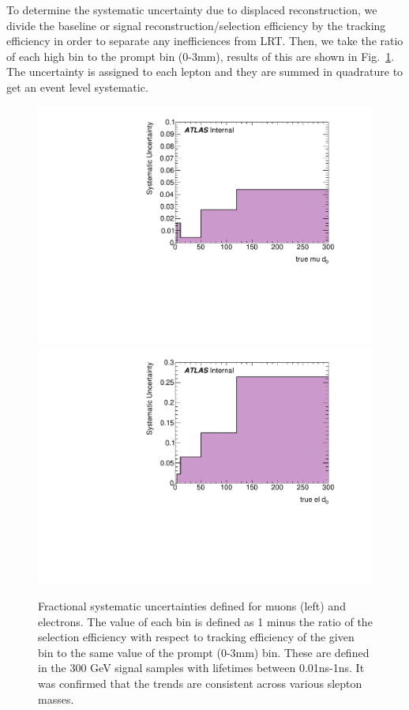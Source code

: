 To determine the systematic uncertainty due to displaced reconstruction, we divide the baseline or signal reconstruction/selection efficiency by the tracking efficiency in order to separate any inefficiences from \ac{LRT}. Then, we take the ratio of each high \dz bin to the prompt bin (0-3mm), results of this are shown in Fig.~\ref{fig:disp_systs}. The uncertainty is assigned to each lepton and they are summed in quadrature to get an event level systematic. 

\begin{figure}[htbp]
\centering
\includegraphics[width=.48\textwidth]{figures/disp_systs/signal_sf_d0_mu_300.pdf}
\includegraphics[width=.48\textwidth]{figures/disp_systs/signal_sf_d0_el_300.pdf}
\caption{Fractional systematic uncertainties defined for muons (left) and electrons. The value of each bin is defined as 1 minus the ratio of the selection efficiency with respect to tracking efficiency of the given bin to the same value of the prompt (0-3mm) bin. These are defined in the 300 GeV signal samples with lifetimes between 0.01ns-1ns. It was confirmed that the trends are consistent across various slepton masses.}
\label{fig:disp_systs}
\end{figure}

